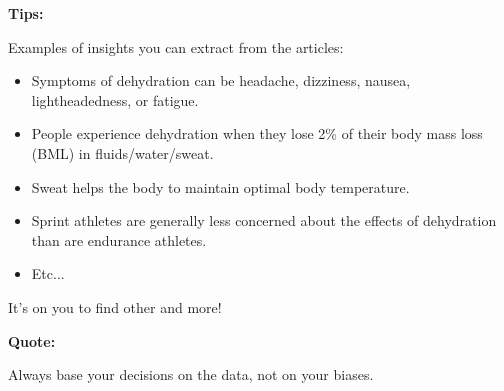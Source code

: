 \textbf{Tips:}

Examples of insights you can extract from the articles:

\begin{itemize}
\item Symptoms of dehydration can be headache, dizziness, nausea, lightheadedness, or fatigue.
\item People experience dehydration when they lose 2\% of their body mass loss (BML) in fluids/water/sweat.
\item Sweat helps the body to maintain optimal body temperature.
\item Sprint athletes are generally less concerned about the effects of dehydration than are endurance athletes.
\item Etc...
\end{itemize}

It's on you to find other and more!

\textbf{Quote:}

Always base your decisions on the data, not on your biases.

